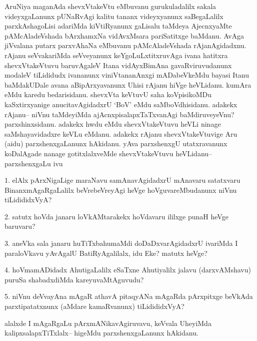 \begin{artha}
AruNiya maganAda shevxVtakeVtu eMbuvanu gurukuladalilx sakala videyxgaLanunx pUNaRvAgi kalitu tananx videyxyanunx saBegaLalilx  parxkAshagoLisi adariMda kiVtiRyanunx gaLisalu taMdeya AjecnxyaMte pAMcAladeVshada bArxhamxNa vidAvxMsara pariSatitxge baMdanu. AvAga jiVvalana putarx parxvAhaNa eMbuvanu pAMcAladeVshada rAjanAgidadxnu. rAjanu seVvakariMda seVveyanunx keYgoLuLxtitxruvAga ivana hatitxra shevxVtakeVtuvu baruvAgaleV Itana vidAyxBimAna gavaRviruvudanunx modaleV tiLididudx ivananunx viniVtananAnxgi mADabeVkeMdu  bayasi Itanu baMdakUDale avana aBipArxyavanunx Uhisi rAjanu hiVge heVLidanu. kumAra eMdu karedu bedarisidanu. shevxVta keVtuvU saha koVpisikoMDu kaSxtirxyanige anucitavAgidadxrU `BoV' eMdu saMboVdhisidanu. adakekx rAjanu{\rm --} niVnu taMdeyiMda ajAcnxpisalapxTaTxvanAgi baMdiruveyeVnu? parxshinxsidanu. adakekx hwdu eMdu shevxVtakeVtuvu heVLi ninage saMshayavidadxre keVLu eMdanu. adakekx rAjanu shevxVtakeVtuvige Aru (aidu) parxshenxgaLanunx hAkidanu. yAva parxshenxgU utatxravanunx koDalAgade nanage gotitxlalxveMde shevxVtakeVtuvu heVLidanu{\rm --} parxshenxgaLu ivu

1. elAlx pArxNigaLige maraNavu samAnavAgidadxrU mAnavaru satatxvaru BinanxmAgaRgaLalilx beVrebeVreyAgi heVge hoVguvareMbudanunx niVnu tiLidididxVyA?

2. satutx hoVda janaru loVkAMtarakekx hoVdavaru ililxge punaH heVge baruvaru?

3. aneVka sala janaru huTiTxbahumaMdi doDaDxvarAgidadxrU ivariMda I paraloVkavu yAvAgalU BatiRyAgalilalx, idu Eke? matutx heVge?

4. hoVmamADidadx AhutigaLalilx eSaTxne Ahutiyalilx jalavu (darxvAMshavu) puruSa shabadxdiMda kareyuvaMtAguvudu?

5. niVnu deVvayAna mAgaR athavA pitaqyANa mAgaRda pArxpitxge beVkAda parxtipatatxnunx (aMdare kamaRvanunx) tiLidididxVyA?

alalxde I mAgaRgaLu pArxmANikavAgiruvavu, keVvala UheyiMda kalipxsalapxTiTxlalx{\rm --} higeMdu parxshenxgaLanunx hAkidanu. 
\end{artha}

